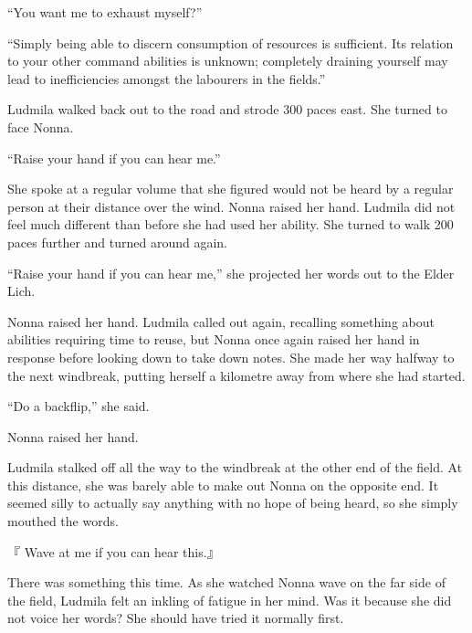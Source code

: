  

“You want me to exhaust myself?”

 

“Simply being able to discern consumption of resources is sufficient. Its relation to your other command abilities is unknown; completely draining yourself may lead to inefficiencies amongst the labourers in the fields.”

 

Ludmila walked back out to the road and strode 300 paces east. She turned to face Nonna.

 

“Raise your hand if you can hear me.”

 

She spoke at a regular volume that she figured would not be heard by a regular person at their distance over the wind. Nonna raised her hand. Ludmila did not feel much different than before she had used her ability. She turned to walk 200 paces further and turned around again.

 

“Raise your hand if you can hear me,” she projected her words out to the Elder Lich.

 

Nonna raised her hand. Ludmila called out again, recalling something about abilities requiring time to reuse, but Nonna once again raised her hand in response before looking down to take down notes. She made her way halfway to the next windbreak, putting herself a kilometre away from where she had started.

 

“Do a backflip,” she said.

 

Nonna raised her hand.

 

Ludmila stalked off all the way to the windbreak at the other end of the field. At this distance, she was barely able to make out Nonna on the opposite end. It seemed silly to actually say anything with no hope of being heard, so she simply mouthed the words.

 

『 Wave at me if you can hear this.』

 

There was something this time. As she watched Nonna wave on the far side of the field, Ludmila felt an inkling of fatigue in her mind. Was it because she did not voice her words? She should have tried it normally first.

